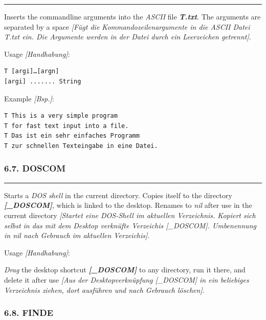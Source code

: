 \documentclass[
]{article}
\begin{document}
\begin{center}\rule{0.5\linewidth}{0.5pt}\end{center}

Inserts the commandline arguments into the \emph{ASCII} file
\textbf{\emph{T.txt}}. The arguments are separated by a space
\emph{{[}Fügt die Kommandozeilenargumente in die ASCII Datei T.txt ein.
Die Argumente werden in der Datei durch ein Leerzeichen getrennt{]}}.

Usage \emph{{[}Handhabung{]}}:

\begin{verbatim}
T [argi]…[argn]
[argi] ....... String
\end{verbatim}

Example \emph{{[}Bsp.{]}}:

\begin{verbatim}
T This is a very simple program
T for fast text input into a file.
T Das ist ein sehr einfaches Programm
T zur schnellen Texteingabe in eine Datei.
\end{verbatim}

\hypertarget{doscom}{%
\subsubsection{6.7. DOSCOM}\label{doscom}}

\begin{center}\rule{0.5\linewidth}{0.5pt}\end{center}

Starts a \emph{DOS} \emph{shell} in the current directory. Copies itself
to the directory \textbf{\emph{{[}\_DOSCOM{]}}}, which is linked to the
desktop. Renames to \emph{nil} after use in the current directory
\emph{{[}Startet eine DOS-Shell im aktuellen Verzeichnis. Kopiert sich
selbst in das mit dem Desktop verknüfte Verzeichis {[}\_DOSCOM{]}.
Umbenennung in nil nach Gebrauch im aktuellen Verzeichis{]}}.

Usage \emph{{[}Handhabung{]}}:

\emph{Drag} the desktop shortcut \textbf{\emph{{[}\_DOSCOM{]}}} to any
directory, run it there, and delete it after use \emph{{[}Aus der
Desktopverknüpfung {[}\_DOSCOM{]} in ein beliebiges Verzeichnis ziehen,
dort ausführen und nach Gebrauch löschen{]}}.

\hypertarget{finde}{%
\subsubsection{6.8. FINDE}\label{finde}}
\end{document}
